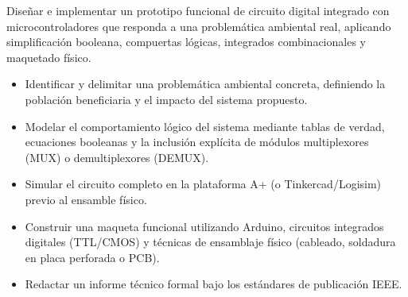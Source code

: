 \documentclass[11pt,letterpaper]{article}
\begin{document}
\pagestyle{empty}

\encabezadoguia

\par
\vspace{0.3em}

\par
\vspace{0.2em}
{\fontsize{10}{12.5}\selectfont Diseñar e implementar un prototipo funcional de circuito digital integrado con microcontroladores que responda a una problemática ambiental real, aplicando simplificación booleana, compuertas lógicas, integrados combinacionales y maquetado físico.\par}

\vspace{0.4em}
\par
\vspace{0.2em}
\begin{itemize}[leftmargin=1.5em,label=\flecha,itemsep=0.2em,topsep=0.1em]
  \item Identificar y delimitar una problemática ambiental concreta, definiendo la población beneficiaria y el impacto del sistema propuesto.
  \item Modelar el comportamiento lógico del sistema mediante tablas de verdad, ecuaciones booleanas y la inclusión explícita de módulos multiplexores (MUX) o demultiplexores (DEMUX).
  \item Simular el circuito completo en la plataforma A+ (o Tinkercad/Logisim) previo al ensamble físico.
  \item Construir una maqueta funcional utilizando Arduino, circuitos integrados digitales (TTL/CMOS) y técnicas de ensamblaje físico (cableado, soldadura en placa perforada o PCB).
  \item Redactar un informe técnico formal bajo los estándares de publicación IEEE.
\end{itemize}

\vspace{0.5em}
\par
\vspace{0.3em}
\end{document}
